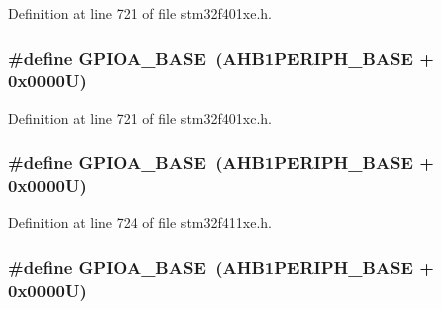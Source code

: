 Definition at line 721 of file stm32f401xe.\+h.

\subsubsection[{\texorpdfstring{G\+P\+I\+O\+A\+\_\+\+B\+A\+SE}{GPIOA_BASE}}]{\setlength{\rightskip}{0pt plus 5cm}\#define G\+P\+I\+O\+A\+\_\+\+B\+A\+SE~({\bf A\+H\+B1\+P\+E\+R\+I\+P\+H\+\_\+\+B\+A\+SE} + 0x0000\+U)}\hypertarget{group___peripheral__registers__structures_gad7723846cc5db8e43a44d78cf21f6efa}{}\label{group___peripheral__registers__structures_gad7723846cc5db8e43a44d78cf21f6efa}


Definition at line 721 of file stm32f401xc.\+h.

\subsubsection[{\texorpdfstring{G\+P\+I\+O\+A\+\_\+\+B\+A\+SE}{GPIOA_BASE}}]{\setlength{\rightskip}{0pt plus 5cm}\#define G\+P\+I\+O\+A\+\_\+\+B\+A\+SE~({\bf A\+H\+B1\+P\+E\+R\+I\+P\+H\+\_\+\+B\+A\+SE} + 0x0000\+U)}\hypertarget{group___peripheral__registers__structures_gad7723846cc5db8e43a44d78cf21f6efa}{}\label{group___peripheral__registers__structures_gad7723846cc5db8e43a44d78cf21f6efa}


Definition at line 724 of file stm32f411xe.\+h.

\subsubsection[{\texorpdfstring{G\+P\+I\+O\+A\+\_\+\+B\+A\+SE}{GPIOA_BASE}}]{\setlength{\rightskip}{0pt plus 5cm}\#define G\+P\+I\+O\+A\+\_\+\+B\+A\+SE~({\bf A\+H\+B1\+P\+E\+R\+I\+P\+H\+\_\+\+B\+A\+SE} + 0x0000\+U)}\hypertarget{group___peripheral__registers__structures_gad7723846cc5db8e43a44d78cf21f6efa}{}\label{group___peripheral__registers__structures_gad7723846cc5db8e43a44d78cf21f6efa}


